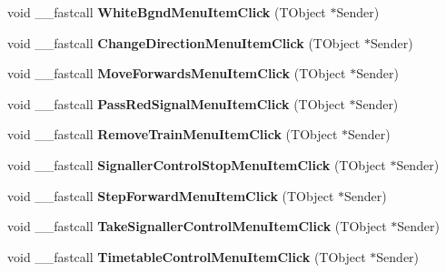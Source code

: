 \begin{DoxyCompactItemize}
\item 
\mbox{\label{class_t_interface_a3a9f9cf4b530f7958ee3d14047fd951a}} 
void \+\_\+\+\_\+fastcall {\bfseries White\+Bgnd\+Menu\+Item\+Click} (T\+Object $\ast$Sender)
\item 
\mbox{\label{class_t_interface_aaaf32c3c815553f7ba70698e0f0071bb}} 
void \+\_\+\+\_\+fastcall {\bfseries Change\+Direction\+Menu\+Item\+Click} (T\+Object $\ast$Sender)
\item 
\mbox{\label{class_t_interface_a50478cade5cae721121f5902528987a7}} 
void \+\_\+\+\_\+fastcall {\bfseries Move\+Forwards\+Menu\+Item\+Click} (T\+Object $\ast$Sender)
\item 
\mbox{\label{class_t_interface_ad7aaed58c91a9ad9598e17fa615024da}} 
void \+\_\+\+\_\+fastcall {\bfseries Pass\+Red\+Signal\+Menu\+Item\+Click} (T\+Object $\ast$Sender)
\item 
\mbox{\label{class_t_interface_a921ff57bd9af8acdd79a7c99d4839218}} 
void \+\_\+\+\_\+fastcall {\bfseries Remove\+Train\+Menu\+Item\+Click} (T\+Object $\ast$Sender)
\item 
\mbox{\label{class_t_interface_a2313bac2c5c5ac3f8b91c46166e35b97}} 
void \+\_\+\+\_\+fastcall {\bfseries Signaller\+Control\+Stop\+Menu\+Item\+Click} (T\+Object $\ast$Sender)
\item 
\mbox{\label{class_t_interface_a0cc484aa9bc0445312ef9191d8212f14}} 
void \+\_\+\+\_\+fastcall {\bfseries Step\+Forward\+Menu\+Item\+Click} (T\+Object $\ast$Sender)
\item 
\mbox{\label{class_t_interface_ab5b80c76a8cc8d2c87f21d323f61c1ce}} 
void \+\_\+\+\_\+fastcall {\bfseries Take\+Signaller\+Control\+Menu\+Item\+Click} (T\+Object $\ast$Sender)
\item 
\mbox{\label{class_t_interface_aec12f0e481024f1268fad36e7188b7a4}} 
void \+\_\+\+\_\+fastcall {\bfseries Timetable\+Control\+Menu\+Item\+Click} (T\+Object $\ast$Sender)
\item 
\mbox{\label{class_t_interface_adfe259347a82aae9fc9538bba9c51cb8}} 

\end{DoxyCompactItemize}
